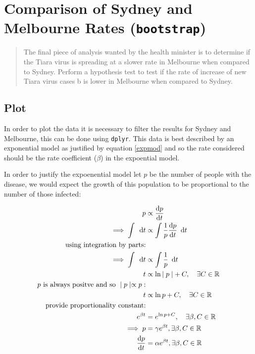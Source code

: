 \documentclass{article}
\newcommand{\passthrough}[1]{#1}
\begin{document}
\hypertarget{question-5}{%
\section{Comparison of Sydney and Melbourne Rates \normalsize \qquad (\texttt{bootstrap})}\label{question-5}}

\begin{quote}
The final piece of analysis wanted by the health minister is to
determine if the Tiara virus is spreading at a slower rate in Melbourne
when compared to Sydney. Perform a hypothesis test to test if the rate
of increase of new Tiara virus cases b is lower in Melbourne when
compared to Sydney.
\end{quote}

\hypertarget{plot-4}{%
\subsection{Plot}\label{plot-4}}

In order to plot the data it is necessary to filter the results for
Sydney and Melbourne, this can be done using
\passthrough{\lstinline!dplyr!}. This data is best described by an
exponential model as justified by equation \eqref{expmod} and so the
rate considered should be the rate coefficient (\(\beta\)) in the
expoential model.

In order to justify the expoenential model let \(p\) be the number of
people with the disease, we would expect the growth of this population
to be proportional to the number of those infected:

\begin{align}
p &\propto \frac{\mathrm{d}p}{\mathrm{d}t} \notag \\
\implies \int  \enspace \mathrm{d}t &\propto \int \frac{1}{p} \frac{\mathrm{d}p}{\mathrm{d}t} \enspace \mathrm{d}t \notag \\
\text{using integration by parts:} \notag \\
\implies \int  \enspace \mathrm{d}t &\propto \int \frac{1}{p} \enspace \mathrm{d}t \notag \\
 t &\propto \ln{\mid p \mid } + C, \quad \exists C \in \mathbb{R} \notag \\
 p \text{ is always positve and so } \mid p \mid \propto p: \notag \\
 t &\propto \ln{ p  } + C, \quad \exists C \in \mathbb{R} \notag \\
 \text{provide proportionality constant:} \notag \\
 e^{\beta t} &= e^{\ln{ p  } + C}, \quad \exists \beta, C \in \mathbb{R}\notag \\
 \implies p &= \gamma e^{\beta t}, \exists \beta, C \in \mathbb{R} \\
\frac{\mathrm{d}p}{\mathrm{d}t} &= \alpha e^{\beta t}, \exists \beta, C \in \mathbb{R}\label{expmod} \\
\end{align}
\end{document}
